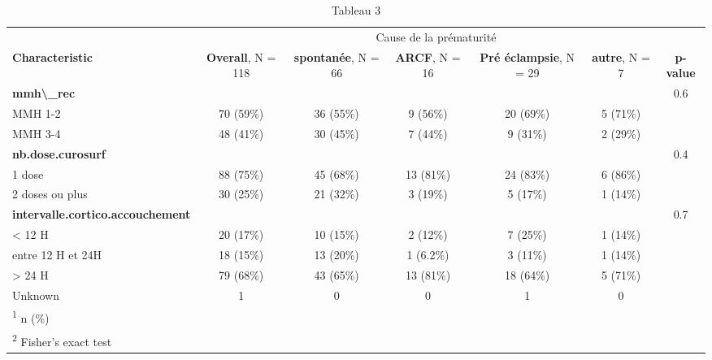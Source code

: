 \documentclass[
  10pt,
  a4paper,
]{scrartcl}
\begin{document}
\begin{table}

\caption{\label{tab:xtable3}Tableau 3}
\centering
\begin{tabular}[t]{l|c|c|c|c|c|c}
\hline
\multicolumn{2}{c|}{ } & \multicolumn{3}{c|}{Cause de la prématurité} & \multicolumn{2}{c}{ } \\
\cline{3-5}
\textbf{Characteristic} & \textbf{Overall}, N = 118 & \textbf{spontanée}, N = 66 & \textbf{ARCF}, N = 16 & \textbf{Pré éclampsie}, N = 29 & \textbf{autre}, N = 7 & \textbf{p-value}\\
\hline
\textbf{mmh\textbackslash{}\_rec} &  &  &  &  &  & 0.6\\
\hline
\hspace{1em}MMH 1-2 & 70 (59\%) & 36 (55\%) & 9 (56\%) & 20 (69\%) & 5 (71\%) & \\
\hline
\hspace{1em}MMH 3-4 & 48 (41\%) & 30 (45\%) & 7 (44\%) & 9 (31\%) & 2 (29\%) & \\
\hline
\textbf{nb.dose.curosurf} &  &  &  &  &  & 0.4\\
\hline
\hspace{1em}1 dose & 88 (75\%) & 45 (68\%) & 13 (81\%) & 24 (83\%) & 6 (86\%) & \\
\hline
\hspace{1em}2 doses ou plus & 30 (25\%) & 21 (32\%) & 3 (19\%) & 5 (17\%) & 1 (14\%) & \\
\hline
\textbf{intervalle.cortico.accouchement} &  &  &  &  &  & 0.7\\
\hline
\hspace{1em}< 12 H & 20 (17\%) & 10 (15\%) & 2 (12\%) & 7 (25\%) & 1 (14\%) & \\
\hline
\hspace{1em}entre 12 H et 24H & 18 (15\%) & 13 (20\%) & 1 (6.2\%) & 3 (11\%) & 1 (14\%) & \\
\hline
\hspace{1em}> 24 H & 79 (68\%) & 43 (65\%) & 13 (81\%) & 18 (64\%) & 5 (71\%) & \\
\hline
\hspace{1em}Unknown & 1 & 0 & 0 & 1 & 0 & \\
\hline
\multicolumn{7}{l}{\rule{0pt}{1em}\textsuperscript{1} n (\%)}\\
\multicolumn{7}{l}{\rule{0pt}{1em}\textsuperscript{2} Fisher's exact test}\\
\end{tabular}
\end{table}
\end{document}
